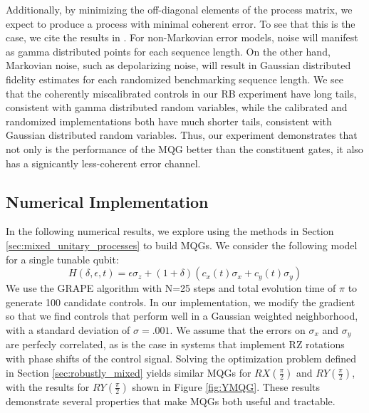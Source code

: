 \documentclass[aps,nofootinbib,pra,notitlepage,twocolumn]{revtex4-1}
\begin{document}
Additionally, by minimizing the off-diagonal elements of the process matrix, we expect to produce a process with minimal coherent error. To see that this is the case, we cite the results in \cite{Ball2016}. For non-Markovian error models, noise will manifest as gamma distributed points for each sequence length. On the other hand, Markovian noise, such as depolarizing noise, will result in Gaussian distributed fidelity estimates for each randomized benchmarking sequence length. We see that the coherently miscalibrated controls in our RB experiment have long tails, consistent with gamma distributed random variables, while the calibrated and randomized implementations both have much shorter tails, consistent with Gaussian distributed random variables. Thus, our experiment demonstrates that not only is the performance of the MQG better than the constituent gates, it also has a signicantly less-coherent error channel.


\subsection{Numerical Implementation}
\label{sec:numerical_results}
In the following numerical results, we explore using the methods in Section \ref{sec:mixed_unitary_processes} to build MQGs. We consider the following model for a single tunable qubit: 
\begin{equation}\label{eq:1Qham}
  H(\delta, \epsilon, t) = \epsilon\sigma_z + (1 + \delta)(c_x(t)\sigma_x + c_y(t)\sigma_y)
\end{equation}
We use the GRAPE algorithm\cite{Khaneja2005} with N=25 steps and total evolution time of $\pi$ to generate 100 candidate controls. In our implementation, we modify the gradient so that we find controls that perform well in a Gaussian weighted neighborhood, with a standard deviation of $\sigma=.001$. We assume that the errors on $\sigma_x$ and $\sigma_y$ are perfecly correlated, as is the case in systems that implement RZ rotations with phase shifts of the control signal. Solving the optimization problem defined in Section \ref{sec:robustly_mixed} yields similar MQGs for $RX(\frac{\pi}{2})$ and $RY(\frac{\pi}{2})$, with the results for $RY(\frac{\pi}{2})$ shown in Figure \ref{fig:YMQG}. These results demonstrate several properties that make MQGs both useful and tractable.
\end{document}
